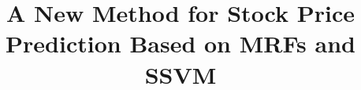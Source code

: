 \documentclass[conference,compsoc]{IEEEtran}
\begin{document}
\title{A New Method for Stock Price Prediction Based on MRFs and SSVM}


\author{}


% 








\maketitle
\end{document}

